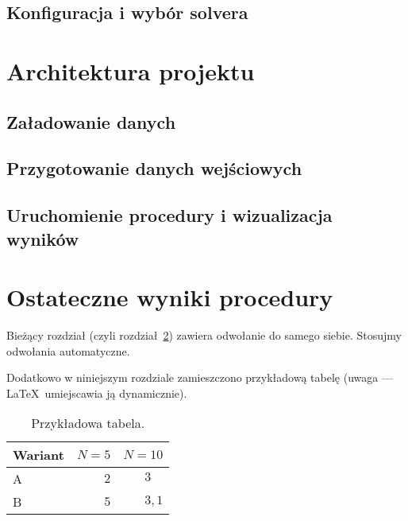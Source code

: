 \documentclass[12pt,a4paper,twoside,openany]{book}
\begin{document}
\subsection{Konfiguracja i wybór solvera}

\section{Architektura projektu}

\subsection{Załadowanie danych}

\subsection{Przygotowanie danych wejściowych}

\subsection{Uruchomienie procedury i wizualizacja wyników}

\section{Ostateczne wyniki procedury}
\label{sec:nast}

Bieżący rozdział (czyli rozdział~\ref{sec:nast}) zawiera odwołanie do samego siebie. Stosujmy odwołania automatyczne.

Dodatkowo w niniejszym rozdziale zamieszczono przykładową tabelę (uwaga --- \LaTeX\ umiejscawia ją dynamicznie).



\begin{table}[h]
\centering
\caption{Przykładowa tabela.}
\label{tab:przyklad}
\footnotesize
\begin{tabular}{|l|r|r|}
\hline
Wariant & $N=5$ & $N=10$\\
\hline
A & $2$ & $3\phantom{{,}1}$ \\
B & $5$ & $3{,}1$ \\

\hline
\end{tabular} 
\end{table}
\end{document}
